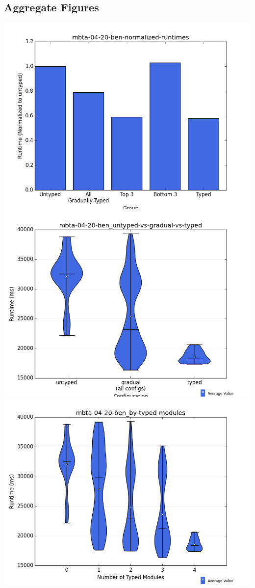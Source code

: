 \documentclass{article}
\begin{document}
\subsection{Aggregate Figures}
\includegraphics[width=\textwidth]{mbta-04-20-ben-normalized-runtimes-bar.png}
\includegraphics[width=\textwidth]{mbta-04-20-ben_untyped-vs-gradual-vs-typed-violin.png}
\includegraphics[width=\textwidth]{mbta-04-20-ben_by-typed-modules-violin.png}
\end{document}
